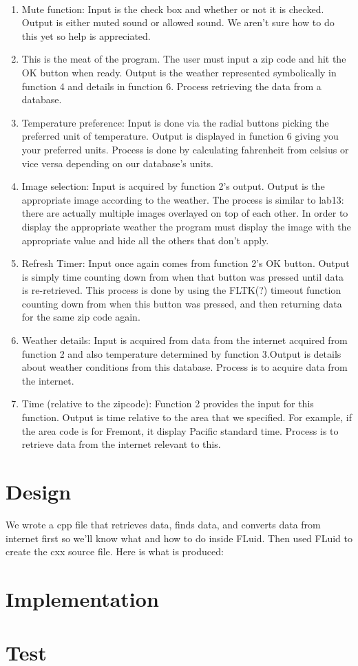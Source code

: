 \documentclass{article}
\begin{document}
\\
\begin{enumerate}
\item Mute function: Input is the check box and whether or not it is checked. Output is either muted sound or allowed sound. We aren't sure how to do this yet so help is appreciated. 
\item This is the meat of the program. The user must input a zip code and hit the OK button when ready. Output is the weather represented symbolically in function 4 and details in function 6. Process retrieving the data from a database. \\
\item Temperature preference: Input is done via the radial buttons picking the preferred unit of temperature. Output is displayed in function 6 giving you your preferred units. Process is done by calculating fahrenheit from celsius or vice versa depending on our database's units.\\
\item Image selection: Input is acquired by function 2's output. Output is the appropriate image according to the weather. The process is similar to lab13: there are actually multiple images overlayed on top of each other. In order to display the appropriate weather the program must display the image with the appropriate value and hide all the others that don't apply.\\
\item Refresh Timer: Input once again comes from function 2's OK button. Output is simply time counting down from when that button was pressed until data is re-retrieved. This process is done by using the FLTK(?) timeout function counting down from when this button was pressed, and then returning data for the same zip code again. 
\item Weather details: Input is acquired from data from the internet acquired from function 2 and also temperature determined by function 3.Output is details about weather conditions from this database. Process is to acquire data from the internet.
\item Time (relative to the zipcode): Function 2 provides the input for this function. Output is time relative to the area that we specified. For example, if the area code is for Fremont, it display Pacific standard time. Process is to retrieve data from the internet relevant to this.
\end{enumerate}

\section{Design}
We wrote a cpp file that retrieves data, finds data, and converts data from internet first so we'll know what and how to do inside FLuid. 
Then used FLuid to create the cxx source file. Here is what is produced:

\section{Implementation}


\section{Test}
\end{document}

